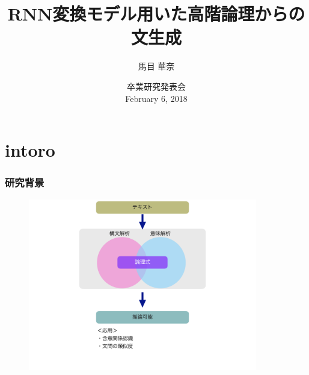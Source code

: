 \documentclass[dvipdfmx]{beamer}
\title{RNN変換モデル用いた高階論理からの文生成}
\author[]{馬目 華奈}
\institute{戸次研究室}
\date{
卒業研究発表会\\
February 6, 2018}
\begin{document}
\begin{frame}
  \titlepage
\end{frame}


\section{intoro}
\begin{frame}
\frametitle{研究背景}
\begin{center}
\begin{figure}[h]
	\includegraphics[width=10cm]{backend1.png}
        \label{fig:backend1}
\end{figure}
\end{center}


\end{frame}
\end{document}
